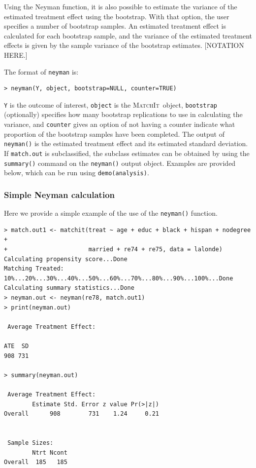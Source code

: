 \documentclass[oneside,letterpaper,titlepage]{article}
\newcommand{\MatchIt}{\textsc{MatchIt}}
\begin{document}
Using the Neyman function, it is also possible to estimate the
variance of the estimated treatment effect using the bootstrap.  With
that option, the user specifies a number of bootstrap samples.  An
estimated treatment effect is calculated for each bootstrap sample,
and the variance of the estimated treatment effects is given by the
sample variance of the bootstrap estimates.  [NOTATION HERE.]

The format of {\tt neyman} is:

\begin{verbatim}
> neyman(Y, object, bootstrap=NULL, counter=TRUE)
\end{verbatim}

{\tt Y} is the outcome of interest, {\tt object} is the \MatchIt\ 
object, {\tt bootstrap} (optionally) specifies how many bootstrap
replications to use in calculating the variance, and {\tt counter}
gives an option of not having a counter indicate what proportion of
the bootstrap samples have been completed.  The output of {\tt
  neyman()} is the estimated treatment effect and its estimated
standard deviation.  If {\tt match.out} is subclassified, the subclass
estimates can be obtained by using the {\tt summary()} command on the
{\tt neyman()} output object.  Examples are provided below, which can
be run using {\tt demo(analysis)}.

\subsubsection{Simple Neyman calculation}
Here we provide a simple example of the use of the {\tt neyman()} function.

\begin{verbatim}
> match.out1 <- matchit(treat ~ age + educ + black + hispan + nodegree +
+                       married + re74 + re75, data = lalonde)
Calculating propensity score...Done
Matching Treated: 10%...20%...30%...40%...50%...60%...70%...80%...90%...100%...Done
Calculating summary statistics...Done
> neyman.out <- neyman(re78, match.out1)
> print(neyman.out)
 
 Average Treatment Effect:
  
ATE  SD
908 731
 
> summary(neyman.out)
 
 Average Treatment Effect:
        Estimate Std. Error z value Pr(>|z|)
Overall      908        731    1.24     0.21
 
 
 Sample Sizes:
        Ntrt Ncont
Overall  185   185
\end{verbatim}
\end{document}
